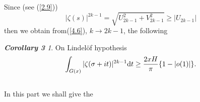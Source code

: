 \documentclass{amsart}
\theoremstyle{definition}
\theoremstyle{remark}
\newtheorem*{mydef43}{{\bf Corollary 3}}
\numberwithin{equation}{section}
\begin{document}
Since (see (\ref{2.9}))
\begin{displaymath}
|\zeta(s)|^{2k-1}=\sqrt{U^2_{2k-1}+V^2_{2k-1}}\geq |U_{2k-1}|
\end{displaymath}
then we obtain from(\ref{4.6}), $k\longrightarrow 2k-1$, the following

\begin{mydef43}
On Lindel\" of hypothesis
\begin{equation} \label{4.7}
\int_{G(x)}|\zeta(\sigma+it)|^{2k-1}{\rm d}t\geq \frac{2xH}{\pi}\{ 1-|o(1)|\}.
\end{equation}
\end{mydef43}

\subsection{}

In this part we shall give the
\end{document}
